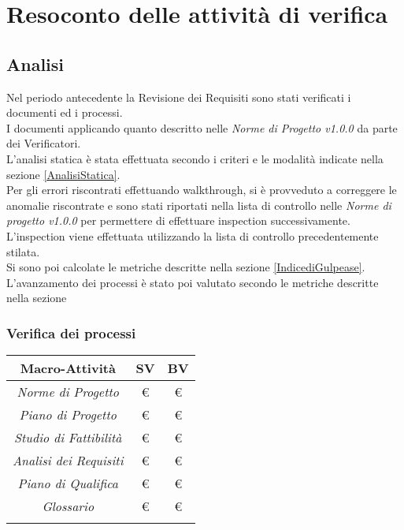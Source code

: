 \chapter{Resoconto delle attività di verifica}
\section{Analisi}
Nel periodo antecedente la Revisione dei Requisiti sono stati verificati i documenti ed i processi.\\
I documenti applicando quanto descritto nelle \textit{Norme di Progetto v1.0.0} da parte dei Verificatori.\\
L'analisi statica è stata effettuata secondo i criteri e le modalità indicate nella sezione \ref{AnalisiStatica}.\\ 
Per gli errori riscontrati effettuando walkthrough, si è provveduto a correggere le anomalie riscontrate e sono stati riportati nella lista di controllo nelle \textit{Norme di progetto v1.0.0} per permettere di effettuare inspection successivamente.\\
L'inspection viene effettuata utilizzando la lista di controllo precedentemente stilata. \\
Si sono poi calcolate le metriche descritte nella sezione \ref{IndicediGulpease}.\\
L'avanzamento dei processi è stato poi valutato secondo le metriche descritte nella sezione 
\subsection{Verifica dei processi}
\begin{tabularx}{\textwidth}{|C|C|C|}
	\hline
	\textbf{Macro-Attività}& \textbf{SV}&\textbf{BV}\\
	\hline
	\textit{Norme di Progetto}    & \euro & \euro\\
	\textit{Piano di Progetto}    & \euro & \euro\\
	\textit{Studio di Fattibilità} & \euro & \euro\\
	\textit{Analisi dei Requisiti}& \euro & \euro\\
	\textit{Piano di Qualifica}   & \euro & \euro\\
	\textit{Glossario}            & \euro & \euro\\
	\hline
	\caption{Esito verifica processi}
\end{tabularx}
